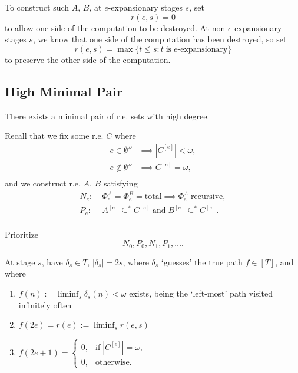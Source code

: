   To construct such $A$, $B$, at $e$-expansionary stages $s$, set
  \[r(e,s) =0\]
  to allow one side of the computation to be destroyed. At non
  $e$-expansionary stages $s$, we know that one side of the computation has
  been destroyed, so set
  \[r(e,s) =\max\{t\leq s: t\; \text{is}\; e\text{-expansionary}\}\]
  to preserve the other side of the computation.

\subsection{High Minimal Pair}
  \begin{theorem}
    There exists a minimal pair of r.e. sets with high degree.
  \end{theorem}

  Recall that we fix some r.e. $C$ where
  \begin{align*}
    e\in\emptyset'' &\implies |C^{[e]}|<\omega,\\
    e\not\in\emptyset'' &\implies C^{[e]}=\omega,\\
  \end{align*}
  and we construct r.e. $A$, $B$ satisfying
  \begin{align*}
    N_e: &\;\Phi_e^A=\Phi_e^B=\text{total} \implies \Phi_e^A\;
      \text{recursive},\\
    P_e: &\;A^{[e]} \subseteq^* C^{[e]}\; \text{and}\; B^{[e]} \subseteq^*
      C^{[e]}.\\
  \end{align*}

  Prioritize
  \[N_0, P_0, N_1, P_1, \ldots.\]

  At stage $s$, have $\delta_s\in T$, $|\delta_s|=2s$, where $\delta_s$
  `guesses' the true path $f\in[T]$, and where
  \begin{enumerate}[label=(\roman*)]
    \item $f(n) :=\liminf_s \delta_s(n) <\omega$ exists, being the
      `left-most' path visited infinitely often
    \item $f(2e)=r(e) :=\liminf_s r(e,s)$
    \item $f(2e+1)=\begin{cases} 0, &\text{if}\; |C^{[e]}|=\omega,\\ 0,
      &\text{otherwise}. \end{cases}$
  \end{enumerate}

